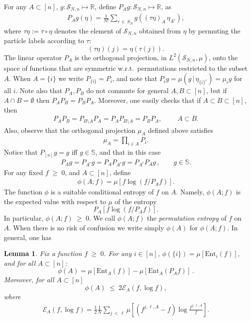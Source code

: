 \documentclass[10pt,a4paper]{amsart}
\renewcommand{\leq}{\;\leqslant\;}
\renewcommand{\geq}{\;\geqslant\;}
\newcommand{\tc}{\, |\, }
\newcommand{\ent}{\mathrm{Ent}}
\newcommand{\cE}{\mathcal{E}}
\newcommand{\cS}{\mathcal{S}}
\newcommand{\bbR}{\mathbb{R}}
\newcommand{\bbS}{\mathbb{S}}
\let\t=\tau
\newtheorem{lemm}[theo]{Lemma}
\theoremstyle{definition}
\theoremstyle{plain}
\numberwithin{equation}{section}
\begin{document}
For any $A\subset [n]$, $g:\cS_{N,n}\mapsto\bbR$, define $P_Ag:\cS_{N,n}\mapsto \bbR$, as
\begin{align}\label{defpA}
P_Ag(\eta) = \frac1{N!}\sum_{\t\,\in\,S_N}g((\t\eta)_A\,\eta_{A^c}),
\end{align}
where $\t\eta:=\t\circ\eta$ denotes the element of $\cS_{N,n}$ obtained from $\eta$ by permuting the particle labels according to $\t$:
\[
(\t\eta)(j) = \eta(\t(j)).
\]
The linear operator $P_A$ is the orthogonal projection, in $L^2(\cS_{N,n},\mu)$, onto the space of functions that are symmetric w.r.t.\ permutations restricted to the subset $A$. When $A=\{i\}$ we write $P_{\{i\}}=P_i$, and note that $P_{i}g = \mu(g\tc \eta_{\{i\}^c})=\mu_i g$ for all $i$. Note also that $P_A,P_B$ do not commute for general $A,B\subset[n]$, but if $A\cap B=\emptyset$ then $P_AP_B=P_BP_A$. Moreover, one easily checks that if $A\subset B\subset [n]$, then
\begin{align}\label{commPA}
P_AP_B = P_{B\setminus A}P_A = P_AP_{B\setminus A}=P_BP_A,\qquad \;A\subset B.
\end{align}
Also, observe that the orthogonal projection $\mu_A$ defined above satisfies
\begin{align}\label{muAPA}
\mu_A = \prod_{i\in A}P_i.
\end{align}
Notice that $P_{[n]}g = g$ iff $g\in\bbS$, and that in this case
\begin{align}\label{enta+7}
P_Ag = P_{A^c}g = P_AP_{A^c}g=P_{A^c}P_{A}g\,,\qquad g\in\bbS.
\end{align}
For any fixed $f\geq 0$, and $A\subset[n]$, define
\begin{align}\label{phia}
\phi(A;f) = \mu\left[f\log(f/P_Af)
\right].
\end{align}
The function $\phi$ is a suitable conditional entropy of $f$ on $A$. Namely, $\phi(A;f)$ is the expected value with respect to $\mu$ of the entropy
\[
P_A\left[f\log(f/P_Af)\right].
\]
In particular, $\phi(A;f) \geq 0$. We call $\phi(A;f) $ the \emph{permutation entropy} of $f$ on $A$. When there is no risk of confusion we write simply $\phi(A)$ for $\phi(A;f)$. In general, one has

\begin{lemm}
\label{propphiA}
Fix a function $f\geq 0$. For any $i\in[n]$, $\phi(\{i\}) = \mu[\ent_i(f)]$, and for all $A\subset[n]$:
\begin{equation}\label{phia2}
\phi(A) = \mu\left[\ent_A(f) \right] - \mu\left[\ent_A(P_Af) \right] \,.
\end{equation}
Moreover, for all $A\subset[n]$
\begin{equation}\label{phiaGQ}
\phi(A) \leq 2\cE_A(f,\log f),
\end{equation}
where
\begin{align}\label{enta+5}
\cE_A(f,\log f)=\frac12\frac1N\sum_{j\,<\,\ell}\mu\left[\left(f^{j,\ell,A} - f\right)
\log \frac{f^{j,\ell,A}}{f}
\right].
\end{align}
\end{lemm}
\end{document}
